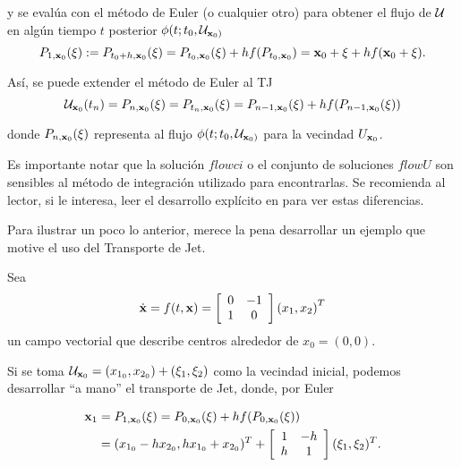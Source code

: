 y se evalúa con el método de Euler (o cualquier otro) para obtener el flujo de $\mathcal{U}$ en algún tiempo $t$ posterior $\phi(t;t_0,\mathcal{U}_{\mathbf{x}_0)}$
\begin{equation*}
P_{1,\mathbf{x}_0}(\xi) := P_{t_0+h,\mathbf{x}_0}(\xi) = P_{t_0,\mathbf{x}_0}(\xi) + h f(P_{t_0,\mathbf{x}_0}) = \mathbf{x}_0 + \xi + h f(\mathbf{x}_0 + \xi).
\end{equation*}

Así, se puede extender el método de Euler al TJ 
\begin{equation}
\mathcal{U}_{\mathbf{x}_0}(t_n) = P_{n,\mathbf{x}_0}(\xi) = P_{t_n,\mathbf{x}_0}(\xi) = P_{n-1,\mathbf{x}_0}(\xi) + h f(P_{n-1,\mathbf{x}_0}(\xi))
\label{eq:eulerU}
\end{equation}

donde $P_{n,\mathbf{x}_0}(\xi)$ representa al flujo $\phi(t;t_0,\mathcal{U}_{\mathbf{x}_0)}$ para la vecindad $U_{\mathbf{x}_0}$.

Es importante notar que la solución $flowci$ o el conjunto de soluciones $flowU$ son sensibles al método de integración utilizado para encontrarlas. Se recomienda al lector, si le interesa, leer el desarrollo explícito en \cite{p-palau} para ver estas diferencias.

Para ilustrar un poco lo anterior, merece la pena desarrollar un ejemplo que motive el uso del Transporte de Jet.

Sea
\begin{align}
\dot{\mathbf{x}} = f(t,\mathbf{x}) = \left[ \begin{array}{cc}
 0 & -1  \\
 1 & 0  \\
\end{array} \right] \left( x_1, x_2 \right)^T
\label{eq:center}
\end{align}
un campo vectorial que describe centros alrededor de $x_0 = (0,0)$. 

Si se toma $\mathcal{U}_{\mathbf{x}_0} = (x_{1_0},x_{2_0}) + (\xi_1,\xi_2)$ como la vecindad inicial, podemos desarrollar ``a mano'' el transporte de Jet, donde, por Euler

\begin{align*}
\mathbf{x}_1 &= P_{1,\mathbf{x}_0}(\xi) = P_{0,\mathbf{x}_0}(\xi) + h f(P_{0,\mathbf{x}_0}(\xi)) \\
&= (x_{1_0} - h x_{2_0}, h x_{1_0} + x_{2_0} )^T + \left[ \begin{array}{cc}
 1 & -h  \\
h & 1  \\
\end{array} \right] (\xi_1,\xi_2)^T.
\end{align*} 

